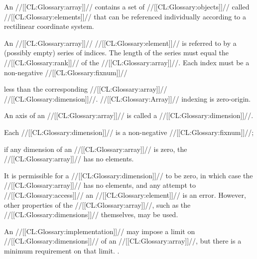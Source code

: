 


An //[[CL:Glossary:array]]// contains a set of //[[CL:Glossary:objects]]// called //[[CL:Glossary:elements]]//
that can be referenced individually according to a rectilinear coordinate system.



An //[[CL:Glossary:array]]// //[[CL:Glossary:element]]// is referred to by a (possibly empty) series of indices.
The length of the series must equal the //[[CL:Glossary:rank]]// of the //[[CL:Glossary:array]]//.
Each index must be a non-negative //[[CL:Glossary:fixnum]]// 


less than the corresponding //[[CL:Glossary:array]]// //[[CL:Glossary:dimension]]//.
//[[CL:Glossary:Array]]// indexing is zero-origin.

\endsubsubsection%


An axis of an //[[CL:Glossary:array]]// is called a //[[CL:Glossary:dimension]]//.

Each //[[CL:Glossary:dimension]]// is a non-negative 
//[[CL:Glossary:fixnum]]//;

 if any dimension of an //[[CL:Glossary:array]]// is zero, the //[[CL:Glossary:array]]// has no elements.


It is permissible for a //[[CL:Glossary:dimension]]// to be zero, 
in which case the //[[CL:Glossary:array]]// has no elements, 
and any attempt to //[[CL:Glossary:access]]// an //[[CL:Glossary:element]]//
is an error.  However, other properties of the //[[CL:Glossary:array]]//,  
such as the //[[CL:Glossary:dimensions]]// themselves, may be used.


An //[[CL:Glossary:implementation]]// may impose a limit on //[[CL:Glossary:dimensions]]// of an //[[CL:Glossary:array]]//,
but there is a minimum requirement on that limit.  .

\endsubsubsubsection%

\endsubsubsection%






